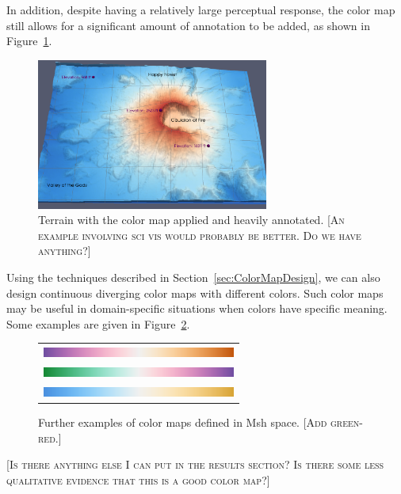 \documentclass[twocolumn]{article}
\newcommand{\sticky}[1]{\textsc{[#1]}}
\newcommand{\Msh}{Msh\xspace}
\begin{document}
In addition, despite having a relatively large perceptual response, the
color map still allows for a significant amount of annotation to be added, as
shown in Figure~\ref{fig:ColorMapWithAnnotation}.

\begin{figure}
  \centering
  \includegraphics[width=3in]{images/AnnotationExample}
  \caption{Terrain with the color map applied and heavily annotated. \sticky{An example involving sci vis would probably be better.  Do we have anything?}}
  \label{fig:ColorMapWithAnnotation}
\end{figure}

Using the techniques described in Section~\ref{sec:ColorMapDesign}, we can
also design continuous diverging color maps with different colors.  Such
color maps may be useful in domain-specific situations when colors have
specific meaning.  Some examples are given in
Figure~\ref{fig:OtherColorMaps}.

\begin{figure}
  \centering
  \begin{tabular}{c}
    \includegraphics[width=2.5in]{images/Purple2OrangeBar} \\
    \includegraphics[width=2.5in]{images/Green2PurpleBar} \\
    \includegraphics[width=2.5in]{images/Blue2TanBar}
  \end{tabular}
  \caption{Further examples of color maps defined in \Msh
  space. \sticky{Add green-red.}}
  \label{fig:OtherColorMaps}
\end{figure}

\sticky{Is there anything else I can put in the results section?  Is there
  some less qualitative evidence that this is a good color map?}
\end{document}
